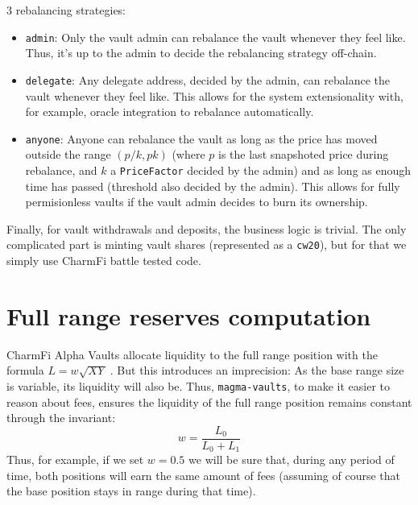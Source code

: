 \documentclass[11pt]{article}
\begin{document}
3 rebalancing strategies:
\begin{itemize}
    \item \texttt{admin}: Only the vault admin can rebalance the vault whenever they
        feel like. Thus, it's up to the admin to decide the rebalancing strategy off-chain.
    \item \texttt{delegate}: Any delegate address, decided by the admin, can rebalance
        the vault whenever they feel like. This allows for the system extensionality with,
        for example, oracle integration to rebalance automatically.
    \item \texttt{anyone}: Anyone can rebalance the vault as long as the price
        has moved outside the range $(p/k, pk)$ (where $p$ is the last
        snapshoted price during rebalance, and $k$ a \texttt{PriceFactor}
        decided by the admin) and as long as enough time has passed (threshold also
        decided by the admin). This allows for fully permisionless vaults if the
        vault admin decides to burn its ownership.
\end{itemize}
Finally, for vault withdrawals and deposits, the business logic is trivial. The
only complicated part is minting vault shares (represented as a \texttt{cw20}),
but for that we simply use CharmFi battle tested code.

\section{Full range reserves computation}
CharmFi Alpha Vaults allocate liquidity to the full range position with
the formula $L = w\sqrt{XY}$ \cite{charmfi-liquidity-computation}. But this
introduces an imprecision: As the base range size is variable, its liquidity
will also be. Thus, \texttt{magma-vaults}, to make it easier to reason about fees,
ensures the liquidity of the full range position remains constant through the
invariant:
\[
w = \frac{L_0}{L_0 + L_1}
\]
Thus, for example, if we set $w = 0.5$ we will be sure that, during any period
of time, both positions will earn the same amount of fees (assuming of course that
the base position stays in range during that time).
\end{document}
